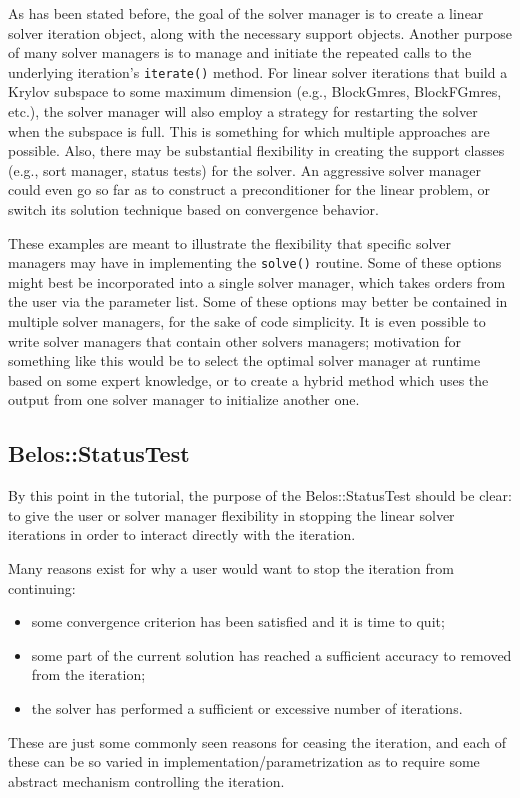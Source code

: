 As has been stated before, the goal of the solver manager is to create a linear solver iteration
object, along with the necessary support objects.  Another purpose of many
solver managers is to manage and initiate the repeated calls to the underlying iteration's
\verb!iterate()! method. For linear solver iterations that build a Krylov subspace to some 
maximum dimension (e.g., BlockGmres, BlockFGmres, etc.), the solver manager will also employ 
a strategy for restarting the solver when the subspace is full. This is something for which
multiple approaches are possible. Also, there may be substantial flexibility in creating
the support classes (e.g., sort manager, status tests) for the solver. An aggressive
solver manager could even go so far as to construct a preconditioner for the linear
problem, or switch its solution technique based on convergence behavior. 

These examples are meant to illustrate the flexibility that specific solver managers may
have in implementing the \verb!solve()! routine. Some of these options might best be
incorporated into a single solver manager, which takes orders from the user via the
parameter list. Some of these options may better be contained in
multiple solver managers, for the sake of code simplicity. It is even possible to write
solver managers that contain other solvers managers; motivation for something like this
would be to select the optimal solver manager at runtime based on some expert knowledge,
or to create a hybrid method which uses the output from one solver manager to
initialize another one.

\subsection{Belos::StatusTest}
\label{sec:belos:tester}

By this point in the tutorial, the purpose of the Belos::StatusTest should be clear: to
give the user or solver manager flexibility in stopping the linear solver iterations in
order to interact directly with the iteration.

Many reasons exist for why a user would want to stop the iteration from continuing:
\begin{itemize}
  \item some convergence criterion has been satisfied and it is time to quit;
  \item some part of the current solution has reached a sufficient accuracy to removed
    from the iteration;
  \item the solver has performed a sufficient or excessive number of iterations.
\end{itemize}
These are just some commonly seen reasons for ceasing the iteration, and each of these can
be so varied in implementation/parametrization as to require some abstract mechanism
controlling the iteration.

